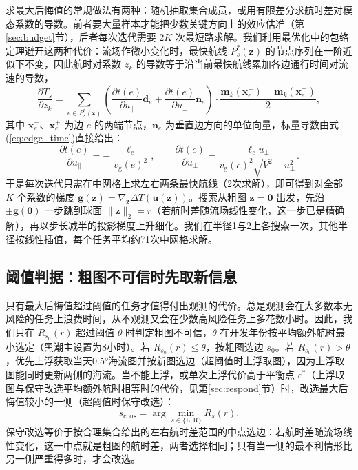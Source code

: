 求最大后悔值的常规做法有两种：随机抽取集合成员，或用有限差分求航时差对模态系数的导数。前者要大量样本才能把少数关键方向上的效应估准（第\ref{sec:budget}节），后者每次迭代需要 $2K$ 次最短路求解。我们利用最优化中的包络定理避开这两种代价：流场作微小变化时，最快航线 $P_s^*(\boldsymbol{z})$ 的节点序列在一阶近似下不变，因此航时对系数 $z_k$ 的导数等于沿当前最快航线累加各边通行时间对流速的导数，
\begin{equation}
\frac{\partial T_s}{\partial z_k} = \sum_{e \in P_s^*(\boldsymbol{z})} \left( \frac{\partial t(e)}{\partial u_{\parallel}} \boldsymbol{d}_e + \frac{\partial t(e)}{\partial u_{\perp}} \boldsymbol{n}_e \right) \cdot \frac{\boldsymbol{m}_k(\boldsymbol{x}_e^{-}) + \boldsymbol{m}_k(\boldsymbol{x}_e^{+})}{2},
\label{eq:envelope_grad}
\end{equation}
其中 $\boldsymbol{x}_e^{-}$、$\boldsymbol{x}_e^{+}$ 为边 $e$ 的两端节点，$\boldsymbol{n}_e$ 为垂直边方向的单位向量，标量导数由式(\ref{eq:edge_time})直接给出：
\begin{equation}
\frac{\partial t(e)}{\partial u_{\parallel}} = -\frac{\ell_e}{v_{\text{g}}(e)^2}, \qquad \frac{\partial t(e)}{\partial u_{\perp}} = \frac{\ell_e u_{\perp}}{v_{\text{g}}(e)^2 \sqrt{V^2 - u_{\perp}^2}}.
\label{eq:edge_deriv}
\end{equation}
于是每次迭代只需在中网格上求左右两条最快航线（2次求解），即可得到对全部 $K$ 个系数的梯度 $\boldsymbol{g}(\boldsymbol{z}) = \nabla_{\boldsymbol{z}} \Delta T(\boldsymbol{u}(\boldsymbol{z}))$。搜索从粗图 $\boldsymbol{z}=\boldsymbol{0}$ 出发，先沿 $\pm\boldsymbol{g}(\boldsymbol{0})$ 一步跳到球面 $\|\boldsymbol{z}\|_2 = r$（若航时差随流场线性变化，这一步已是精确解），再以步长减半的投影梯度上升细化。我们在半径1与2上各搜索一次，其他半径按线性插值，每个任务平均约71次中网格求解。

\subsection{阈值判据：粗图不可信时先取新信息}
\label{sec:gate}
只有最大后悔值超过阈值的任务才值得付出观测的代价。总是观测会在大多数本无风险的任务上浪费时间，从不观测又会在少数高风险任务上多花数小时。因此，我们只在 $R_{s_0}(r)$ 超过阈值 $\theta$ 时判定粗图不可信，$\theta$ 在开发年份按平均额外航时最小选定（黑潮主设置为8小时）。若 $R_{s_0}(r) \le \theta$，按粗图选边 $s_0$。若 $R_{s_0}(r) > \theta$，优先上浮获取当天0.5°海流图并按新图选边（超阈值时上浮取图），因为上浮取图能同时更新两侧的海流。当不能上浮，或单次上浮代价高于平衡点 $c^*$（上浮取图与保守改选平均额外航时相等时的代价，见第\ref{sec:respond}节）时，改选最大后悔值较小的一侧（超阈值时保守改选）：
\begin{equation}
s_{\text{cons}} = \arg\min_{s \in \{\text{L}, \text{R}\}} R_s(r).
\label{eq:conservative_choice}
\end{equation}
保守改选等价于按合理集合给出的左右航时差范围的中点选边：若航时差随流场线性变化，这一中点就是粗图的航时差，两者选择相同；只有当一侧的最不利情形比另一侧严重得多时，才会改选。

